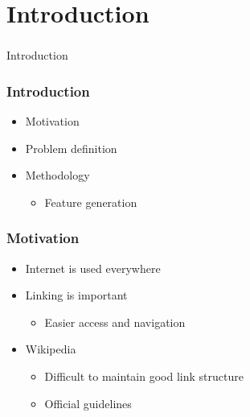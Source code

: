 \section[Introduction]{Introduction}

\begin{frame}
  \frametitle{}
  \begin{center}
    {\Huge Introduction}
  \end{center}
\end{frame}
\note{
}

\begin{frame}
    \frametitle{Introduction}
    \centering
    \begin{itemize}
      \item Motivation
      \item Problem definition
      \item Methodology
        \begin{itemize}
          \item Feature generation
        \end{itemize}
    \end{itemize}
\end{frame}

\begin{frame}
    \frametitle{Motivation}
    \centering
    \begin{itemize}
      \item Internet is used everywhere
      \item Linking is important
        \begin{itemize}
          \item Easier access and navigation
        \end{itemize}
      \item Wikipedia
        \begin{itemize}
           \item Difficult to maintain good link structure
           \item Official guidelines
         \end{itemize}
    \end{itemize}
\end{frame}
\note{
}

